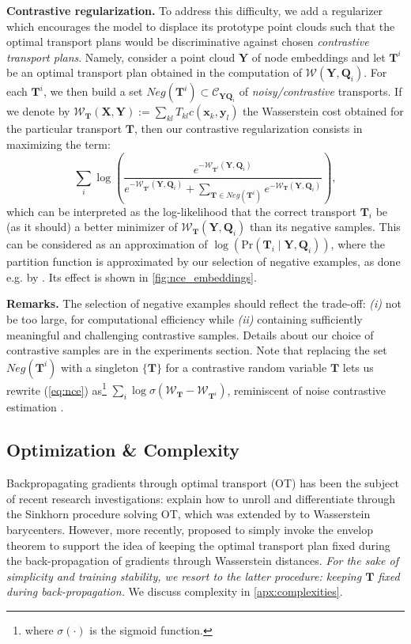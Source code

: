 \documentclass[letterpaper]{article} \usepackage{aaai22}  \usepackage{times}  \usepackage{helvet}  \usepackage{courier}  \usepackage[hyphens]{url}  \usepackage{graphicx} \urlstyle{rm} \def\UrlFont{\rm}  \usepackage{natbib}  \usepackage{caption} \DeclareCaptionStyle{ruled}{labelfont=normalfont,labelsep=colon,strut=off} \frenchspacing  \setlength{\pdfpagewidth}{8.5in}  \setlength{\pdfpageheight}{11in}  \usepackage{algorithm}
\newcommand{\x}{{\mathbf x}}
\newcommand{\T}{{\mathbf T}}
\newcommand{\X}{{\mathbf X}}
\newcommand{\Y}{{\mathbf Y}}
\newcommand{\Q}{{\mathbf Q}}
\newcommand{\Was}{{\mathcal W}}
\begin{document}
\textbf{Contrastive regularization. } To address this difficulty, we add a regularizer which encourages the model to displace its prototype point clouds such that the optimal transport plans would be discriminative against chosen \textit{contrastive transport plans}. Namely, consider a point cloud $\Y$ of node embeddings and let $\T^{i}$ be an optimal transport plan obtained in the computation of $\Was(\Y,\Q_i)$. For each $\T^{i}$, we then build a set $Neg(\T^i)\subset \mathcal{C}_{\Y\Q_i}$ of \textit{noisy/contrastive} transports. If we denote by $\Was_{\T}(\X,\Y):= \sum_{kl}T_{kl}c(\x_k,\mathbf{y}_l)$ the Wasserstein cost obtained for the particular transport $\T$, then our contrastive regularization consists in maximizing the term:
\begin{equation}\label{eq:nce}
   \sum_i \log\left(\dfrac{e^{ -\Was_{\T^i}(\Y,\Q_i) }}{e^{ -\Was_{\T^i}(\Y,\Q_i) }+\sum_{\T\in Neg(\T^i)} e^{ - \Was_\T(\Y,\Q_i)}}\right),
\end{equation}
which can be interpreted as the log-likelihood that the correct transport $\T_i$ be (as it should) a better minimizer of $\Was_\T(\Y,\Q_i)$ than its negative samples. This can be considered as an approximation of $\log(\mathrm{Pr}(\T_i\mid \Y,\Q_i))$, where the partition function is approximated by our selection of negative examples, as done e.g. by \cite{nickel2017poincare}. Its effect is shown in \cref{fig:nce_embeddings}.

\textbf{Remarks. } The selection of negative examples should reflect the trade-off: \textit{(i)} not be too large, for computational efficiency while \textit{(ii)} containing sufficiently meaningful and challenging contrastive samples. Details about our choice of contrastive samples are in the experiments section. Note that replacing the set $Neg(\T^i)$ with a singleton $\{\T\}$ for a contrastive random variable $\T$ lets us rewrite (\cref{eq:nce}) as\footnote{where $\sigma(\cdot)$ is the sigmoid function.} $\sum_i\log\sigma(\Was_\T-\Was_{\T^i})$, reminiscent of noise contrastive estimation \citep{gutmann2010noise}.


\subsection{Optimization \& Complexity}\label{sec:opt}
Backpropagating gradients through optimal transport (OT) has been the subject of recent research investigations: \cite{genevay2017learning} explain how to unroll and differentiate through the Sinkhorn procedure solving OT, which was extended by \cite{schmitz2018wasserstein} to Wasserstein barycenters. However, more recently,  \cite{xu2019gromovfactor} proposed to simply invoke the envelop theorem \citep{afriat1971theory} to support the idea of keeping the optimal transport plan fixed during the back-propagation of gradients through Wasserstein distances. \textit{For the sake of simplicity and training stability, we resort to the latter procedure: keeping $\T$ fixed during back-propagation.} We discuss complexity in \cref{apx:complexities}. 
\end{document}
